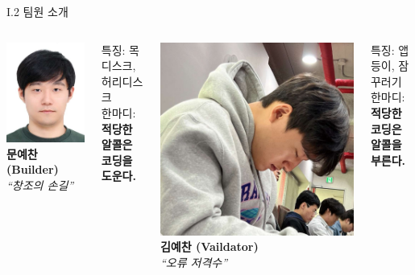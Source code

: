 \documentclass{beamer}
\begin{document}
\begin{frame}{I.2 팀원 소개}
	\begin{columns}[T,onlytextwidth]	
		\centering
		\includegraphics[width=.5\linewidth,height=.35\textheight]{moon.jpg}\\
		\textbf{문예찬 (Builder)}\\
		\textit{``창조의 손길''}\\
		\begin{flushleft}\footnotesize
			특징: 목 디스크, 허리디스크\\
			한마디: \textbf{적당한 알콜은 코딩을 도운다.}
		\end{flushleft}
	
		\centering
		\includegraphics[width=.5\linewidth,height=.35\textheight]{kim.jpg}\\
		\textbf{김예찬 (Vaildator)}\\
		\textit{``오류 저격수''}\\
		\begin{flushleft}\footnotesize
			특징: 앱등이, 잠꾸러기\\
			한마디: \textbf{ 적당한 코딩은 알콜을 부른다.}
		\end{flushleft}
	\end{columns}
\end{frame}
\end{document}
